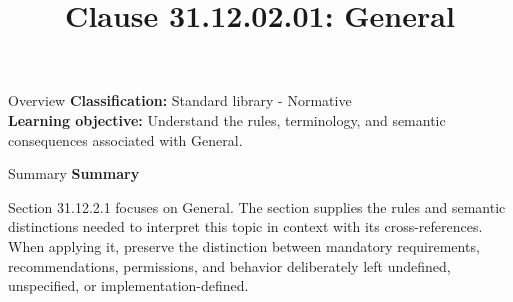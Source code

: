 \documentclass[10pt,letterpaper]{article}
\title{Clause 31.12.02.01: General}
\author{}
\date{}
\begin{document}
\maketitle
\begin{CornellOverviewBox}{Overview}
\textbf{Classification:} Standard library - Normative\\[2pt]
\textbf{Learning objective:} Understand the rules, terminology, and semantic consequences associated with General.
\end{CornellOverviewBox}\begin{CornellSummaryBox}{Summary}
{\sffamily\bfseries\color{Accent} Summary}\par\vspace{3pt}Section 31.12.2.1 focuses on General. The section supplies the rules and semantic distinctions needed to interpret this topic in context with its cross-references. When applying it, preserve the distinction between mandatory requirements, recommendations, permissions, and behavior deliberately left undefined, unspecified, or implementation-defined.
\end{CornellSummaryBox}
\end{document}
